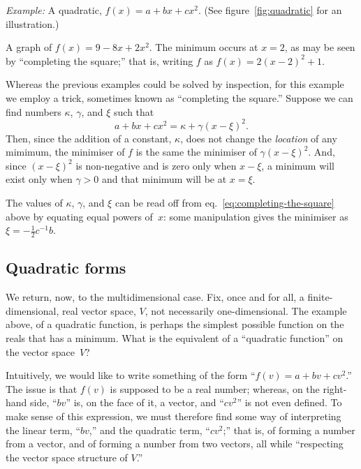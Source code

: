 \documentclass[10pt, a4paper]{article}
\newcommand{\eg}{\emph{Example:}}
\begin{document}
\eg{} A quadratic, $f(x) = a + bx + cx^2$. (See
figure~\ref{fig:quadratic} for an illustration.)
\begin{marginfigure}
  \begin{center}
  \end{center}
  \caption{A graph of $f(x) = 9 - 8x + 2x^2$. The minimum occurs at
    $x=2$, as may be seen by “completing the square;” that is, writing
    $f$ as $f(x) = 2{(x-2)}^2+1$.\label{fig:quadratic}}
\end{marginfigure}
Whereas the previous examples could be solved by inspection, for this
example we employ a trick, sometimes known as “completing the square.”
Suppose we can find numbers $\kappa$, $\gamma$, and $\xi$ such that
\begin{equation}
  a + bx + cx^2 = \kappa + \gamma{(x - \xi)}^2.
\label{eq:completing-the-square}
\end{equation}
Then, since the addition of a constant, $\kappa$, does not change the
\emph{location} of any mimimum, the minimiser of $f$ is the same the
minimiser of $\gamma{(x-\xi)}^2$. And, since ${(x-\xi)}^2$ is non-negative and
is zero only when $x-\xi$, a minimum will exist only when $\gamma >0$ and
that minimum will be at $x=\xi$.

The values of $\kappa$, $\gamma$, and $\xi$ can be read off from
eq.~\eqref{eq:completing-the-square} above by equating equal powers
of~$x$: some manipulation gives the minimiser as
$\xi=-\frac{1}{2}c^{-1}b$.

\subsection*{Quadratic forms}
We return, now, to the multidimensional case. Fix, once and for all, a
finite-dimensional, real vector space, $V$, not necessarily
one-dimensional. The example above, of a quadratic function, is
perhaps the simplest possible function on the reals that has a
minimum. What is the equivalent of a ``quadratic function'' on the
vector space~$V$?

Intuitively, we would like to write something of the form
``$f(v) = a+bv+cv^2$.'' The issue is that $f(v)$ is supposed to be a
real number; whereas, on the right-hand side, ``$bv$'' is, on the face
of it, a vector, and ``$cv^2$'' is not even defined. To make sense of
this expression, we must therefore find some way of interpreting the
linear term, ``$bv$,'' and the quadratic term, ``$cv^2$;'' that is, of
forming a number from a vector, and of forming a number from two
vectors, all while “respecting the vector space structure of $V$.”
\end{document}
